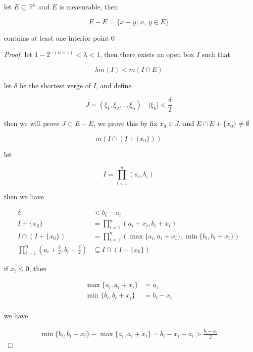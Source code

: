 \documentclass[11pt,a4paper]{article}
\begin{document}
\begin{thm}
    let $E \subseteq \mathbb{R}^n$ and $E$ is measurable, then

    \[
        E - E = \{ x -y \,\vert\, x,\,y \in E\}
    \]

    contains at least one interior point $0$
\end{thm}


\begin{proof}
    let $1 - 2^{-(n+1)} < \lambda < 1$, then there exists an open box $I$ such that

    \[
        \lambda m(I) < m(I \cap E)
    \]

    let $\delta$ be the shortest verge of $I$, and define

    \[
        J = (\xi_1, \xi_2, .., \xi_n)\quad  \lvert \xi_k \rvert < \frac{\delta}{2}
    \]

    then we will prove $J \subset E - E$, we prove this by fix $x_0 \in J$, and $E \cap E + \{ x_0 \} \ne \emptyset$

    \[
        m(I \cap (I + \{ x_0 \}))
    \]

    let

    \[
        I = \prod_{i=1}^{n}(a_i, b_i)
    \]

    then we have

    \begin{align*}
        \delta & < b_i - a_i \\
        I + \{ x_0 \} & = \prod_{i=1}^{n}(a_i + x_i, b_i + x_i) \\
        I \cap \left( I + \{ x_0 \} \right) &= \prod_{i=1}^{n}( \max \{ a_i, a_i + x_i \}, \min \{ b_i, b_i + x_i\}) \\
        \prod_{i=1}^{n}( a_i + \frac{\delta}{2}, b_i - \frac{\delta}{2}) & \subseteq I \cap \left( I + \{ x_0 \} \right)
    \end{align*}

    if $x_i \le 0 $, then

    \begin{align*}
        \max \{ a_i, a_i + x_i \} &= a_i \\
        \min \{ b_i, b_i + x_i \} &= b_i - x_i \\
    \end{align*}

    we have

    \begin{align*}
        \min \{ b_i, b_i + x_i \} - \max \{ a_i, a_i + x_i \} = b_i - x_i - a_i > \frac{b_i - a_i}{2}
    \end{align*}


\end{proof}
\end{document}
